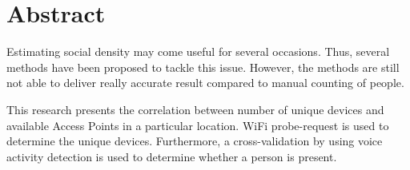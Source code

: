 \begingroup
\let\clearpage\relax
\let\cleardoublepage\relax
\let\cleardoublepage\relax

\chapter*{Abstract}
Estimating social density may come useful for several occasions. Thus, several methods have been proposed to tackle this issue. However, the methods are still not able to deliver really accurate result compared to manual counting of people.

This research presents the correlation between number of unique devices and available Access Points in a particular location. WiFi probe-request is used to determine the unique devices. Furthermore, a cross-validation by using voice activity detection is used to determine whether a person is present.

\endgroup			

\vfill